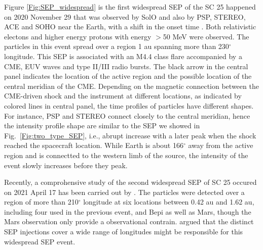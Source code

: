 Figure \ref{Fig:SEP_widespread} is the first widespread \ac{SEP} of the \ac{SC} 25 happened on 2020 November 29 that was observed by \ac{SolO} and also by \ac{PSP}, \ac{STEREO}, \acl{ACE} and \ac{SOHO} near the Earth, with a shift in the onset time \citep{Kolhoff2021AA, Kouloumvakos2022AA, Palmerio2022SpWea}. Both relativistic electons and higher energy protons with energy $>$50 MeV were observed. The particles in this event spread over a region 1 au spanning more than 230$^\circ$ longitude. This SEP is associated with an M4.4 class flare accompanied by a \ac{CME}, \ac{EUV} waves and type II/III radio bursts. The black arrow in the central panel indicates the location of the active region and the possible location of the central meridian of the \ac{CME}.  Depending on the magnetic connection between the \ac{CME}-driven shock and the instrument at different locations, as indicated by colored lines in central panel, the time profiles of particles have different shapes. For instance, \ac{PSP} and \ac{STEREO} connect closely to the central meridian, hence the intensity profile shape are similar to the \ac{SEP} we showed in Fig.~\ref{Fig:two_type_SEP}, i.e., abrupt increase with a later peak when the shock reached the spacecraft location. While Earth is about 166$^\circ$ away from the active region and is connectted to the western limb of the source, the intensity of the event slowly increases before they peak.

Recently, a comprohensive study of the second widespread \ac{SEP} of \ac{SC} 25 occured on 2021 April 17 has been carried out by \citet{dresing202317}. The particles were detected over a region of more than 210$^\circ$ longitude at six locations between 0.42 au and 1.62 au, including four used in the previous event, and \ac{Bepi} as well as Mars, though the Mars observation only provide a observational contrain. \citet{dresing202317} argued that the distinct SEP injections cover a wide range of longitudes might be responsible for this widespread SEP event.

